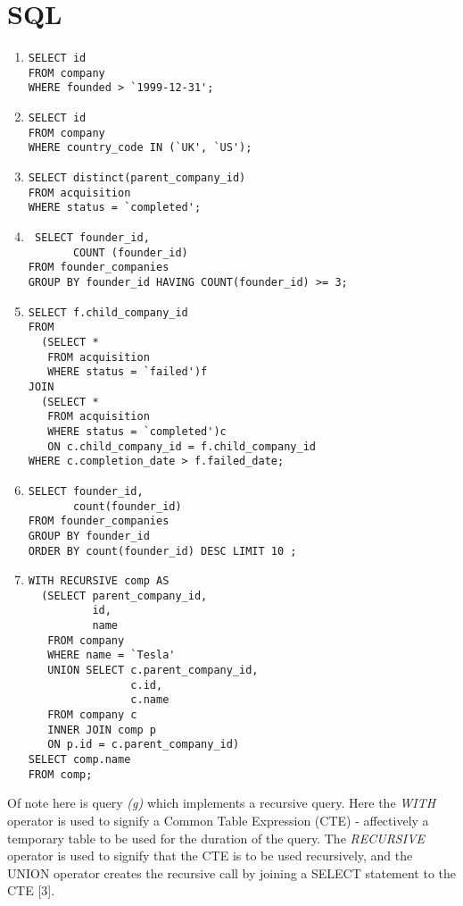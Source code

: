 \documentclass[12pt]{article}
\begin{document}
\section{SQL}
\begin{enumerate}

 \item\label{part1}\begin{verbatim}SELECT id
FROM company
WHERE founded > `1999-12-31';\end{verbatim}

  \item\label{part1}\begin{verbatim}SELECT id
FROM company
WHERE country_code IN (`UK', `US');\end{verbatim}
  \item\label{part1}\begin{verbatim}SELECT distinct(parent_company_id)
FROM acquisition
WHERE status = `completed';\end{verbatim}
  \item\label{part1}\begin{verbatim} SELECT founder_id,
       COUNT (founder_id)
FROM founder_companies
GROUP BY founder_id HAVING COUNT(founder_id) >= 3;\end{verbatim}
  \item\label{part1}\begin{verbatim}SELECT f.child_company_id
FROM
  (SELECT *
   FROM acquisition
   WHERE status = `failed')f
JOIN
  (SELECT *
   FROM acquisition
   WHERE status = `completed')c
   ON c.child_company_id = f.child_company_id
WHERE c.completion_date > f.failed_date;\end{verbatim}
  \item\label{part1}\begin{verbatim}SELECT founder_id,
       count(founder_id)
FROM founder_companies
GROUP BY founder_id
ORDER BY count(founder_id) DESC LIMIT 10 ;\end{verbatim}
  \item\label{part1}\begin{verbatim}WITH RECURSIVE comp AS
  (SELECT parent_company_id,
          id,
          name
   FROM company
   WHERE name = `Tesla'
   UNION SELECT c.parent_company_id,
                c.id,
                c.name
   FROM company c
   INNER JOIN comp p
   ON p.id = c.parent_company_id)
SELECT comp.name
FROM comp;\end{verbatim}
\end{enumerate}

Of note here is query \emph{(g)} which implements a recursive query. Here the \emph{WITH} operator is used to signify a Common Table Expression (CTE) - affectively a temporary table to be used for the duration of the query. The \emph{RECURSIVE} operator is used to signify that the CTE is to be used recursively, and the UNION operator creates the recursive call by joining a SELECT statement to the CTE [3].
\end{document}
